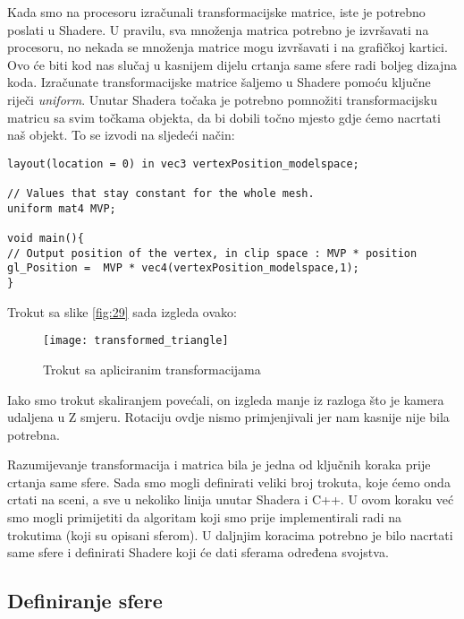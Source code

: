 Kada smo na procesoru izračunali transformacijske matrice, iste je potrebno poslati u Shadere. U pravilu, sva množenja matrica potrebno je izvršavati na procesoru, no nekada se množenja matrice mogu izvršavati i na grafičkoj kartici. Ovo će biti kod nas slučaj u kasnijem dijelu crtanja same sfere radi boljeg dizajna koda. Izračunate transformacijske matrice šaljemo u Shadere pomoću ključne riječi \emph{uniform}. Unutar Shadera točaka je potrebno pomnožiti transformacijsku matricu sa svim točkama objekta, da bi dobili točno mjesto gdje ćemo nacrtati naš objekt. To se izvodi na sljedeći način:
\begin{lstlisting}[style = myC++, label = {code:17}, caption = {Primjer transformacije objekata}]
layout(location = 0) in vec3 vertexPosition_modelspace;

// Values that stay constant for the whole mesh.
uniform mat4 MVP;

void main(){
// Output position of the vertex, in clip space : MVP * position
gl_Position =  MVP * vec4(vertexPosition_modelspace,1);
}

\end{lstlisting}
Trokut sa slike \ref{fig:29} sada izgleda ovako:
\begin{figure}[!http]
	\begin{center}
		\texttt{[image: transformed\_triangle]}
		\caption{Trokut sa apliciranim transformacijama}
		\label{fig:31}
	\end{center}
\end{figure}
Iako smo trokut skaliranjem povećali, on izgleda manje iz razloga što je kamera udaljena u Z smjeru. Rotaciju ovdje nismo primjenjivali jer nam kasnije nije bila potrebna.

Razumijevanje transformacija i matrica bila je jedna od ključnih koraka prije crtanja same sfere. Sada smo mogli definirati veliki broj trokuta, koje ćemo onda crtati na sceni, a sve u nekoliko linija unutar Shadera i C++. U ovom koraku već smo mogli primijetiti da algoritam koji smo prije implementirali radi na trokutima (koji su opisani sferom). U daljnjim koracima potrebno je bilo nacrtati same sfere i definirati Shadere koji će dati sferama određena svojstva.

\subsection{Definiranje sfere}